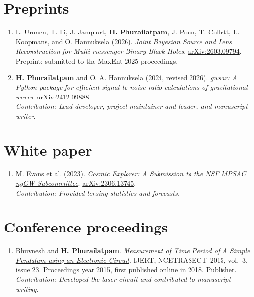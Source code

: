 \documentclass[11pt]{article}
\begin{document}
\section*{Preprints}
\begin{enumerate}[start=13]
\item L. Uronen, T. Li, J. Janquart, \textbf{H. Phurailatpam}, J. Poon, T. Collett, L. Koopmans, and O. Hannuksela (2026). \textit{Joint Bayesian Source and Lens Reconstruction for Multi-messenger Binary Black Holes}. \href{https://arxiv.org/abs/2603.09794}{arXiv:2603.09794}. Preprint; submitted to the MaxEnt 2025 proceedings.
\item \textbf{H. Phurailatpam} and O. A. Hannuksela (2024, revised 2026). \textit{gwsnr: A Python package for efficient signal-to-noise ratio calculations of gravitational waves}. \href{https://arxiv.org/abs/2412.09888}{arXiv:2412.09888}.\\\emph{Contribution: Lead developer, project maintainer and leader, and manuscript writer.}
\end{enumerate}
\section*{White paper}
\begin{enumerate}[start=15]
\item M. Evans et al. (2023). \href{https://arxiv.org/abs/2306.13745}{\textit{Cosmic Explorer: A Submission to the NSF MPSAC ngGW Subcommittee}}. \href{https://arxiv.org/abs/2306.13745}{arXiv:2306.13745}.\\\emph{Contribution: Provided lensing statistics and forecasts.}
\end{enumerate}
\section*{Conference proceedings}
\begin{enumerate}[start=16]
\item Bhuvnesh and \textbf{H. Phurailatpam}. \href{https://www.ijert.org/measurement-of-time-period-of-a-simple-pendulum-using-an-electronic-circuit}{\textit{Measurement of Time Period of A Simple Pendulum using an Electronic Circuit}}. IJERT, NCETRASECT--2015, vol.\ 3, issue 23. Proceedings year 2015, first published online in 2018. \href{https://www.ijert.org/measurement-of-time-period-of-a-simple-pendulum-using-an-electronic-circuit}{Publisher}.\\\emph{Contribution: Developed the laser circuit and contributed to manuscript writing.}
\end{enumerate}
\end{document}
